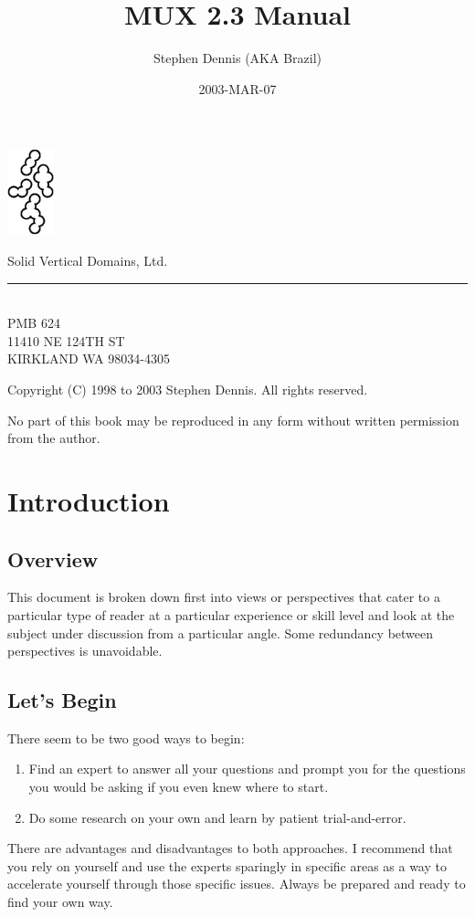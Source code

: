\documentclass[dvips]{book}
\title{MUX 2.3 Manual}
\author{Stephen Dennis (AKA Brazil)}
\date{2003-MAR-07}
\begin{document}
\frontmatter
\maketitle

\begin{minipage}[t]{0.64in}
\includegraphics[height=0.98in]{latticeS.ps}
\end{minipage}
\begin{minipage}[t]{2.75in}
\vspace{-0.90in}
\LARGE{Solid Vertical Domains, Ltd.}\\
\rule{2.75in}{0.02in}\\
\normalsize PMB 624\\
11410 NE 124TH ST\\
KIRKLAND WA 98034-4305
\end{minipage}

Copyright (C) 1998 to 2003 Stephen Dennis. All rights reserved.

No part of this book may be reproduced in any form without written permission from the author.

\mainmatter
\chapter{Introduction}
\section{Overview}
This document is broken down first into views or perspectives that cater to a
particular type of reader at a particular experience or skill level and look
at the subject under discussion from a particular angle.
Some redundancy between perspectives is unavoidable.
\section{Let's Begin}
There seem to be two good ways to begin:
\begin{enumerate}
\item
Find an expert to answer all your questions and prompt you for the questions
you would be asking if you even knew where to start.
\item
Do some research on your own and learn by patient trial-and-error.
\end{enumerate}
There are advantages and disadvantages to both approaches. I recommend that
you rely on yourself and use the experts sparingly in specific areas as a way
to accelerate yourself through those specific issues. Always be prepared and
ready to find your own way.
\end{document}
